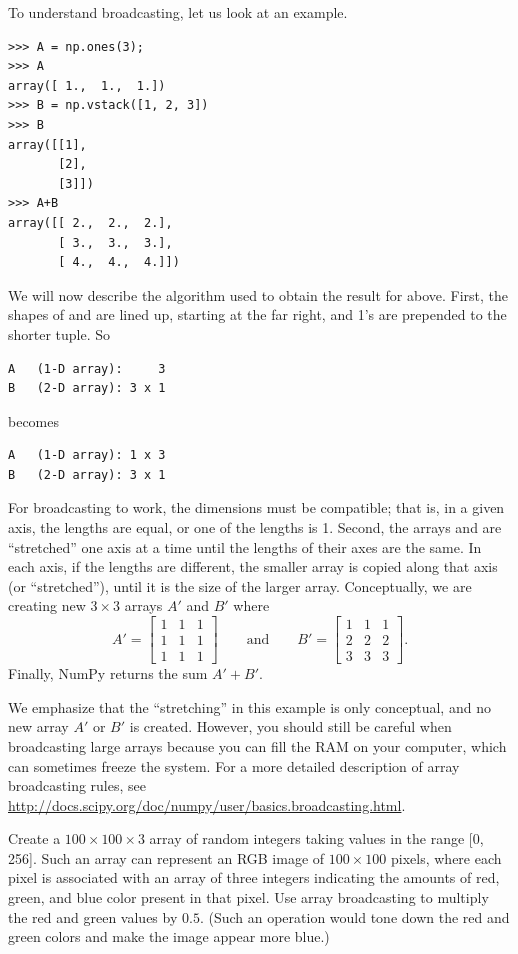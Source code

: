 To understand broadcasting, let us look at an example. 
\begin{lstlisting}
>>> A = np.ones(3);
>>> A
array([ 1.,  1.,  1.])
>>> B = np.vstack([1, 2, 3])
>>> B
array([[1],
       [2],
       [3]])
>>> A+B
array([[ 2.,  2.,  2.],
       [ 3.,  3.,  3.],
       [ 4.,  4.,  4.]])
\end{lstlisting}
We will now describe the algorithm used to obtain the result for  above. 
First, the shapes of  and  are lined up, starting at the far right, and 1's are prepended to the shorter tuple. So
\begin{lstlisting}
A 	(1-D array):     3
B	(2-D array): 3 x 1
\end{lstlisting}
becomes
\begin{lstlisting}
A 	(1-D array): 1 x 3
B	(2-D array): 3 x 1
\end{lstlisting}
For broadcasting to work, the dimensions must be compatible; that is, in a given axis, the lengths are equal, or one of the lengths is 1. 
Second, the arrays  and  are ``stretched'' one axis at a time until the lengths of their axes are the same. 
In each axis, if the lengths are different, the smaller array is copied along that axis (or ``stretched''), until it is the size of the larger array. 
Conceptually, we are creating new $3 \times 3$ arrays $A'$ and $B'$ where
\[
A' = \left[ \begin{array}{ccc}
1 & 1 & 1\\
1 & 1 & 1\\
1 & 1 & 1 \end{array} \right] \qquad \text{and} \qquad B' =  \left[ \begin{array}{ccc}
1 & 1 & 1\\
2 & 2 & 2\\
3 & 3 & 3\end{array} \right].
\]
Finally, NumPy returns the sum $A'+B'$.

We emphasize that the ``stretching'' in this example is only conceptual, and no new array $A'$ or $B'$ is created. However, 
you should still be careful when broadcasting large arrays because you can fill the 
RAM on your computer, which can sometimes freeze the system.
For a more detailed description of array broadcasting rules, see 
\url{http://docs.scipy.org/doc/numpy/user/basics.broadcasting.html}.

\begin{problem}
Create a $100\times100\times3$ array of random integers taking values in the range 
[0, 256]. Such an array can represent an RGB image of $100\times100$ pixels, 
where each pixel is associated with an array of three integers indicating the 
amounts of red, green, and blue color present in that pixel.
Use array broadcasting to multiply the red and green values by $0.5$. 
(Such an operation would tone down the red and green colors and make the 
image appear more blue.) 
\end{problem}


